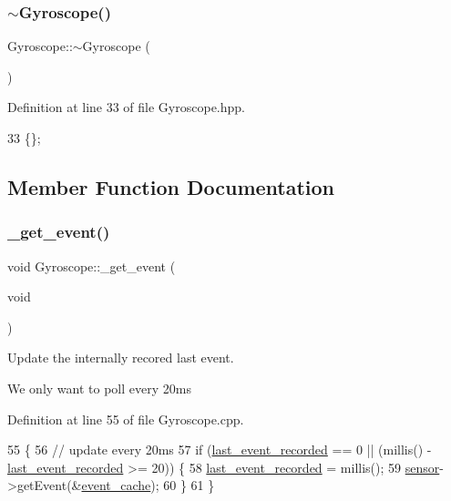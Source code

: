 \subsubsection{\texorpdfstring{$\sim$\+Gyroscope()}{~Gyroscope()}}
{\footnotesize\ttfamily Gyroscope\+::$\sim$\+Gyroscope (\begin{DoxyParamCaption}{ }\end{DoxyParamCaption})\hspace{0.3cm}{\ttfamily [inline]}}



Definition at line 33 of file Gyroscope.\+hpp.


\begin{DoxyCode}
33 \{\};
\end{DoxyCode}


\subsection{Member Function Documentation}
\mbox{\label{class_gyroscope_abd15bf5d98f1d4b6ee3aff051812972e}} 
\subsubsection{\texorpdfstring{\+\_\+get\+\_\+event()}{\_get\_event()}}
{\footnotesize\ttfamily void Gyroscope\+::\+\_\+get\+\_\+event (\begin{DoxyParamCaption}\item[{void}]{ }\end{DoxyParamCaption})\hspace{0.3cm}{\ttfamily [private]}}



Update the internally recored last event. 

We only want to poll every 20ms 

Definition at line 55 of file Gyroscope.\+cpp.


\begin{DoxyCode}
55                                \{
56     \textcolor{comment}{// update every 20ms}
57     \textcolor{keywordflow}{if} (\hyperlink{class_gyroscope_a8a6c3d747717b3bede6400c17a4696b6}{last\_event\_recorded} == 0 || (millis() - 
      \hyperlink{class_gyroscope_a8a6c3d747717b3bede6400c17a4696b6}{last\_event\_recorded} >= 20)) \{
58         \hyperlink{class_gyroscope_a8a6c3d747717b3bede6400c17a4696b6}{last\_event\_recorded} = millis();
59         \hyperlink{class_gyroscope_a7a8dacdbe6d1fcd8004fa62b0997e2bf}{sensor}->getEvent(&\hyperlink{class_gyroscope_a6c8b9e319b379c2f1582afbe25e68c76}{event\_cache});
60     \}
61 \}
\end{DoxyCode}
\mbox{\label{class_gyroscope_a019f1512ef009051ca2a899759321a9e}} 

